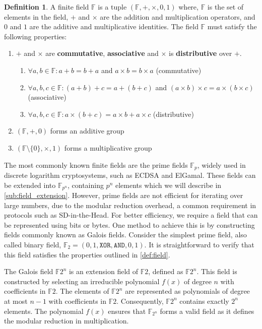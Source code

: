 \documentclass[twoside,11pt]{report}
\theoremstyle{definition}
\newtheorem{definition}{Definition}[section]
\theoremstyle{plain}
\begin{document}
\begin{definition}\label{def:field}
  A finite field $\mathbb{F}$ is a tuple $(\mathbb{F}, +, \times, 0, 1)$ where, $\mathbb{F}$ is the set of elements in the field, $+$ and $\times$ are the addition and multiplication operators, and $0$ and $1$ are the additive and multiplicative identities. The field $\mathbb{F}$ must satisfy the following properties:
  \begin{enumerate}
    \item  $+$ and $\times$ are \textbf{commutative}, \textbf{associative} and $\times$ is \textbf{distributive} over $+$.
          \begin{enumerate}
            \item $\forall a,b \in \mathbb{F}: a + b = b + a$ and $a \times b = b \times a$ (commutative)
            \item $\forall a,b,c \in \mathbb{F}: (a + b) + c = a + (b + c)$ and $(a \times b) \times c = a \times (b \times c)$ (associative)
            \item $\forall a,b,c \in \mathbb{F}: a \times (b + c) = a \times b + a \times c$ (distributive)
          \end{enumerate}
    \item $(\mathbb{F}, +, 0)$ forms an additive group
    \item $(\mathbb{F} \setminus \{0\}, \times, 1)$ forms a multiplicative group
  \end{enumerate}
\end{definition}

\noindent
The most commonly known finite fields are the prime fields $\mathbb{F}_p$, widely used in discrete logarithm cryptosystems, such as ECDSA and ElGamal. These fields can be extended into $\mathbb{F}_{p^n}$, containing $p^n$ elements which we will describe in \autoref{sub:field_extension}. However, prime fields are not efficient for iterating over large numbers, due to the modular reduction overhead, a common requirement in protocols such as SD-in-the-Head. For better efficiency, we require a field that can be represented using bits or bytes. One method to achieve this is by constructing fields commonly known as Galois fields. Consider the simplest prime field, also called binary field, $\mathbb{F}_2 = ({0,1}, \texttt{XOR}, \texttt{AND}, 0, 1)$. It is straightforward to verify that this field satisfies the properties outlined in \autoref{def:field}.

The Galois field $\mathbb{F}{2^n}$ is an extension field of $\mathbb{F}2$, defined as $\mathbb{F}{2^n}$. This field is constructed by selecting an irreducible polynomial $f(x)$ of degree $n$ with coefficients in $\mathbb{F}2$. The elements of $\mathbb{F}{2^n}$ are represented as polynomials of degree at most $n-1$ with coefficients in $\mathbb{F}2$. Consequently, $\mathbb{F}{2^n}$ contains exactly $2^n$ elements. The polynomial $f(x)$ ensures that $\mathbb{F}_{2^n}$ forms a valid field as it defines the modular reduction in multiplication.
\end{document}
